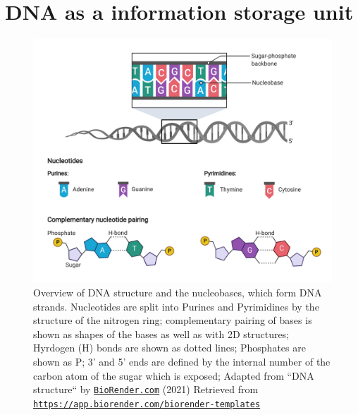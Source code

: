 \section[DNA]{DNA as a information storage unit}
\label{intro-sec:DNA}

\begin{figure}[!ht]
\centering
\includegraphics[width=0.9\linewidth]{Figures/DNAStructure}
\caption[Overview DNA structure]{Overview of DNA structure and the nucleobases, which form DNA strands. Nucleotides are split into Purines and Pyrimidines by the structure of the nitrogen ring; complementary pairing of bases is shown as shapes of the bases as well as with 2D structures; Hyrdogen (H) bonds are shown as dotted lines; Phosphates are shown as P; 3' and 5' ends are defined by the internal number of the carbon atom of the sugar which is exposed; Adapted from ``DNA structure`` by \href{https://biorender.com}{\nolinkurl{BioRender.com}} (2021) Retrieved from \href{https://app.biorender.com/biorender-templates}{\nolinkurl{https://app.biorender.com/biorender-templates}}}\label{fig:DNAstructure}
\end{figure}


